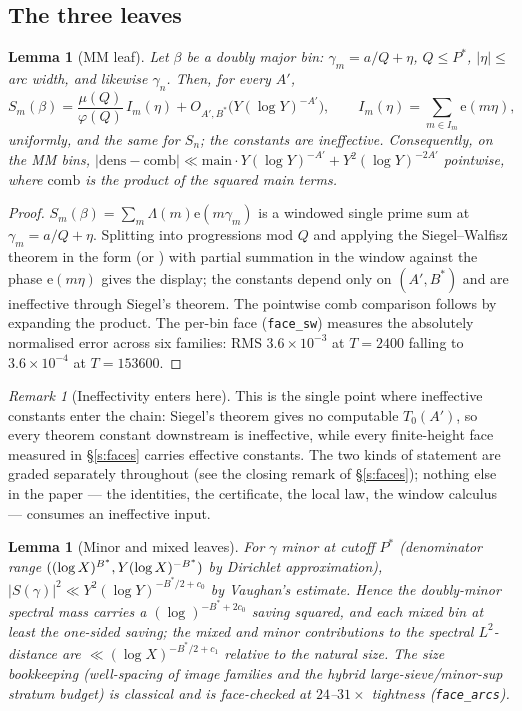 \documentclass[11pt]{article}
\numberwithin{equation}{section}
\newtheorem{lemma}[theorem]{Lemma}
\theoremstyle{definition}
\theoremstyle{remark}
\newtheorem{remark}[theorem]{Remark}
\newcommand{\LL}{\Lambda}
\newcommand{\e}{\mathrm{e}}
\begin{document}
\subsection{The three leaves}

\begin{lemma}[MM leaf]\label{l:MM}
Let $\beta$ be a doubly major bin: $\gamma_m=a/Q+\eta$,
$Q\le P^{*}$, $|\eta|\le$ arc width, and likewise $\gamma_n$.
Then, for every $A'$,
\[
S_m(\beta)=\frac{\mu(Q)}{\varphi(Q)}\,I_m(\eta)
+O_{A',B^{*}}\!\bigl(Y(\log Y)^{-A'}\bigr),
\qquad
I_m(\eta)=\sum_{m\in I_m}\e(m\eta),
\]
uniformly, and the same for $S_n$; the constants are ineffective.
Consequently, on the MM bins,
$\bigl|\mathrm{dens}-\mathrm{comb}\bigr|
\ll\mathrm{main}\cdot Y(\log Y)^{-A'}+Y^{2}(\log Y)^{-2A'}$
pointwise, where $\mathrm{comb}$ is the product of the squared
main terms.
\end{lemma}

\begin{proof}
$S_m(\beta)=\sum_m\LL(m)\e(m\gamma_m)$ is a windowed single prime
sum at $\gamma_m=a/Q+\eta$. Splitting into progressions mod $Q$
and applying the Siegel--Walfisz theorem in the form
\cite[\S22]{Dav} (or \cite[Cor.~5.29]{IK}) with partial summation
in the window against the phase $\e(m\eta)$ gives the display;
the constants depend only on $(A',B^{*})$ and are ineffective
through Siegel's theorem. The pointwise comb comparison follows
by expanding the product. The per-bin face
(\texttt{face\_sw}) measures the absolutely normalised error
across six families: RMS $3.6\times10^{-3}$ at $T=2400$ falling
to $3.6\times10^{-4}$ at $T=153600$.
\end{proof}

\begin{remark}[Ineffectivity enters here]\label{r:ineffective}
This is the single point where ineffective constants enter the
chain: Siegel's theorem gives no computable $T_0(A')$, so every
theorem constant downstream is ineffective, while every
finite-height face measured in \S\ref{s:faces} carries
effective constants. The two kinds of statement are graded
separately throughout (see the closing remark of
\S\ref{s:faces}); nothing else in the paper --- the identities,
the certificate, the local law, the window calculus --- consumes
an ineffective input.
\end{remark}

\begin{lemma}[Minor and mixed leaves]\label{l:minor}
For $\gamma$ minor at cutoff $P^{*}$ (denominator range
$((\log X)^{B^{*}}, \\ 
Y(\log X)^{-B^{*}})$ by Dirichlet
approximation), $|S(\gamma)|^{2}\ll Y^{2}(\log Y)^{-B^{*}/2+c_0}$
by Vaughan's estimate. Hence the doubly-minor spectral mass
carries a $(\log)^{-B^{*}+2c_0}$ saving squared, and each mixed
bin at least the one-sided saving; the mixed and minor
contributions to the spectral $L^{2}$-distance are
$\ll(\log X)^{-B^{*}/2+c_1}$ relative to the natural size. The
size bookkeeping (well-spacing of image families and the hybrid
large-sieve/minor-sup stratum budget) is classical and is
face-checked at $24$--$31\times$ tightness
(\texttt{face\_arcs}).
\end{lemma}
\end{document}
